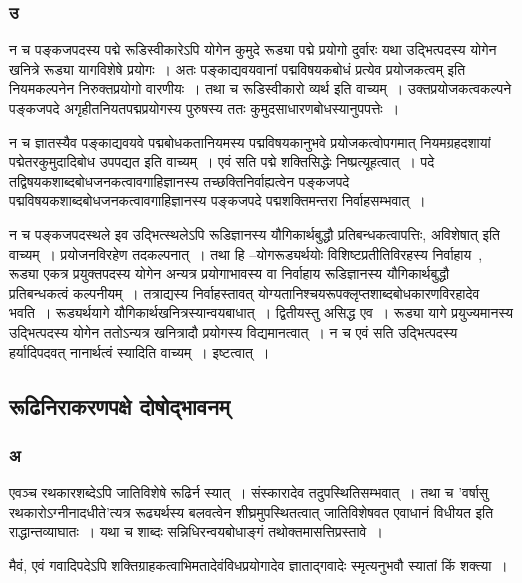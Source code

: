 			\subsubsection{उ}
			
				न च पङ्कजपदस्य पद्मे रूडिस्वीकारेऽपि योगेन कुमुदे रूड्या पद्मे प्रयोगो दुर्वारः यथा उद्भित्पदस्य योगेन खनित्रे रूड्या यागविशेषे  प्रयोगः~। अतः पङ्काद्यवयवानां पद्मविषयकबोधं प्रत्येव  प्रयोजकत्वम् इति नियमकल्पनेन निरुक्तप्रयोगो वारणीयः~। तथा च रूडिस्वीकारो व्यर्थ इति वाच्यम्~। उक्तप्रयोजकत्वकल्पने पङ्कजपदे अगृहीतनियतपद्मप्रयोगस्य  पुरुषस्य ततः कुमुदसाधारणबोधस्यानुपपत्तेः~।

				न च ज्ञातस्यैव पङ्काद्यवयवे पद्मबोधकतानियमस्य पद्मविषयकानुभवे प्रयोजकत्वोपगमात् नियमग्रहदशायां पद्मेतरकुमुदादिबोध उपपद्यत इति वाच्यम्~। एवं सति पद्मे शक्तिसिद्धेः निष्प्रत्यूहत्वात्~। पदे तद्विषयकशाब्दबोधजनकत्वावगाहिज्ञानस्य  तच्छक्तिनिर्वाह्यत्वेन पङ्कजपदे पद्मविषयकशाब्दबोधजनकत्वावगाहिज्ञानस्य पङ्कजपदे पद्मशक्तिमन्तरा निर्वाहसम्भवात्~।

				न च पङ्कजपदस्थले इव उद्भित्स्थलेऽपि  रूडिज्ञानस्य यौगिकार्थबुद्धौ प्रतिबन्धकत्वापत्तिः, अविशेषात् इति वाच्यम्~। प्रयोजनविरहेण तदकल्पनात्~। तथा हि –योगरूड्यर्थयोः विशिष्टप्रतीतिविरहस्य निर्वाहाय~, रूड्या एकत्र प्रयुक्तपदस्य योगेन अन्यत्र प्रयोगाभावस्य वा निर्वाहाय रूडिज्ञानस्य  यौगिकार्थबुद्धौ प्रतिबन्धकत्वं कल्पनीयम्~। तत्राद्यस्य निर्वाहस्तावत्  योग्यतानिश्चयरूपक्लृप्तशाब्दबोधकारणविरहादेव भवति~। रूड्यर्थयागे यौगिकार्थखनित्रस्यान्वयबाधात्~। द्वितीयस्तु असिद्ध एव~। रूड्या यागे प्रयुज्यमानस्य उद्भित्पदस्य  योगेन ततोऽन्यत्र खनित्रादौ प्रयोगस्य विद्यमानत्वात्~। न च एवं सति उद्भित्पदस्य हर्यादिपदवत्  नानार्थत्वं स्यादिति वाच्यम्~। इष्टत्वात्~। 

		\subsection{रूढिनिराकरणपक्षे दोषोद्भावनम्}

			\subsubsection{अ}
			
				\begin{small}
				
					एवञ्च रथकारशब्देऽपि जातिविशेषे रूढिर्न स्यात्~। संस्कारादेव तदुपस्थितिसम्भवात्~। तथा च ’वर्षासु रथकारोऽग्नीनादधीते’त्यत्र रूढ्यर्थस्य बलवत्वेन शीघ्रमुपस्थितत्वात् जातिविशेषवत एवाधानं विधीयत इति राद्धान्तव्याघातः~। यथा च शाब्दः सन्निधिरन्वयबोधाङ्गं तथोक्तमासत्तिप्रस्तावे~।
			
					मैवं, एवं गवादिपदेऽपि शक्तिग्राहकत्वाभिमतादेवंविधप्रयोगादेव ज्ञाताद्गवादेः स्मृत्यनुभवौ स्यातां किं शक्त्या~। 
				\end{small}
			
